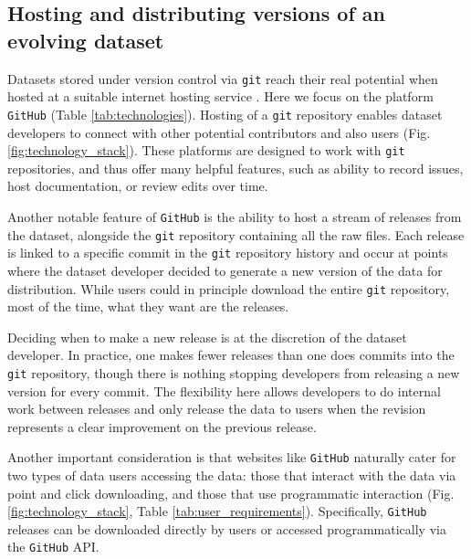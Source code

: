 \documentclass[a4paper,num-refs]{assets/oup-contemporary}
\begin{document}
\subsection{Hosting and distributing versions of an evolving dataset}

Datasets stored under version control via \texttt{git} reach their real potential when hosted at a suitable internet hosting service \cite{Ram-2013,Perkel-2016}. Here we focus on the platform \texttt{GitHub} (Table \ref{tab:technologies}). Hosting of a \texttt{git} repository enables dataset developers to connect with other potential contributors and also users (Fig. \ref{fig:technology_stack}). These platforms are designed to work with \texttt{git} repositories, and thus offer many helpful features, such as ability to record issues, host documentation, or review edits over time.

Another notable feature of \texttt{GitHub} is the ability to host a stream of releases from the dataset, alongside the \texttt{git} repository containing all the raw files. Each release is linked to a specific commit in the \texttt{git} repository history and occur at points where the dataset developer decided to generate a new version of the data for distribution. While users could in principle download the entire \texttt{git} repository, most of the time, what they want are the releases.

Deciding when to make a new release is at the discretion of the dataset developer. In practice, one makes fewer releases than one does commits into the \texttt{git} repository, though there is nothing stopping developers from releasing a new version for every commit. The flexibility here allows developers to do internal work between releases and only release the data to users when the revision represents a clear improvement on the previous release.

Another important consideration is that websites like \texttt{GitHub} naturally cater for two types of data users accessing the data: those that interact with the data via point and click downloading, and those that use programmatic interaction (Fig. \ref{fig:technology_stack}, Table \ref{tab:user_requirements}). Specifically, \texttt{GitHub} releases can be downloaded directly by users or accessed programmatically via the \texttt{GitHub} API.
\end{document}
